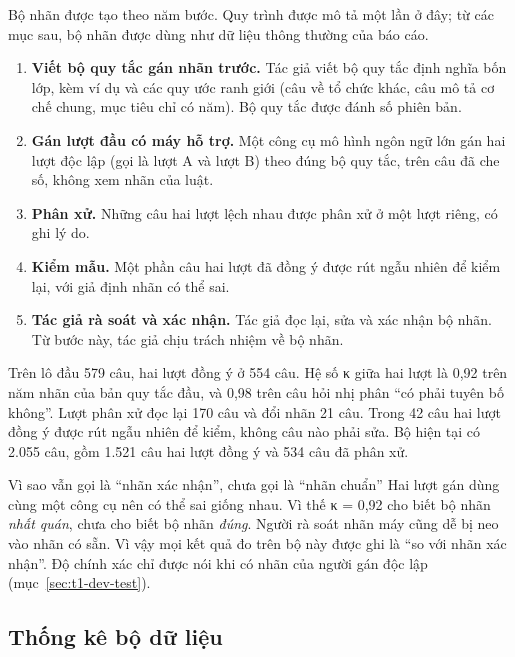 Bộ nhãn được tạo theo năm bước. Quy trình được mô tả một lần ở đây; từ các mục sau, bộ nhãn được dùng như dữ liệu thông thường của báo cáo.

\begin{enumerate}
\item \textbf{Viết bộ quy tắc gán nhãn trước.} Tác giả viết bộ quy tắc định nghĩa bốn lớp, kèm ví dụ và các quy ước ranh giới (câu về tổ chức khác, câu mô tả cơ chế chung, mục tiêu chỉ có năm). Bộ quy tắc được đánh số phiên bản.
\item \textbf{Gán lượt đầu có máy hỗ trợ.} Một công cụ mô hình ngôn ngữ lớn gán hai lượt độc lập (gọi là lượt A và lượt B) theo đúng bộ quy tắc, trên câu đã che số, không xem nhãn của luật.
\item \textbf{Phân xử.} Những câu hai lượt lệch nhau được phân xử ở một lượt riêng, có ghi lý do.
\item \textbf{Kiểm mẫu.} Một phần câu hai lượt đã đồng ý được rút ngẫu nhiên để kiểm lại, với giả định nhãn có thể sai.
\item \textbf{Tác giả rà soát và xác nhận.} Tác giả đọc lại, sửa và xác nhận bộ nhãn. Từ bước này, tác giả chịu trách nhiệm về bộ nhãn.
\end{enumerate}

Trên lô đầu 579 câu, hai lượt đồng ý ở 554 câu. Hệ số κ giữa hai lượt là 0,92 trên năm nhãn của bản quy tắc đầu, và 0,98 trên câu hỏi nhị phân “có phải tuyên bố không”. Lượt phân xử đọc lại 170 câu và đổi nhãn 21 câu. Trong 42 câu hai lượt đồng ý được rút ngẫu nhiên để kiểm, không câu nào phải sửa. Bộ hiện tại có 2.055 câu, gồm 1.521 câu hai lượt đồng ý và 534 câu đã phân xử.

\begin{luuy}{Vì sao vẫn gọi là “nhãn xác nhận”, chưa gọi là “nhãn chuẩn”}
Hai lượt gán dùng cùng một công cụ nên có thể sai giống nhau. Vì thế κ = 0,92 cho biết bộ nhãn \emph{nhất quán}, chưa cho biết bộ nhãn \emph{đúng}. Người rà soát nhãn máy cũng dễ bị neo vào nhãn có sẵn. Vì vậy mọi kết quả đo trên bộ này được ghi là “so với nhãn xác nhận”. Độ chính xác chỉ được nói khi có nhãn của người gán độc lập (mục~\ref{sec:t1-dev-test}).
\end{luuy}

\subsection{Thống kê bộ dữ liệu}

